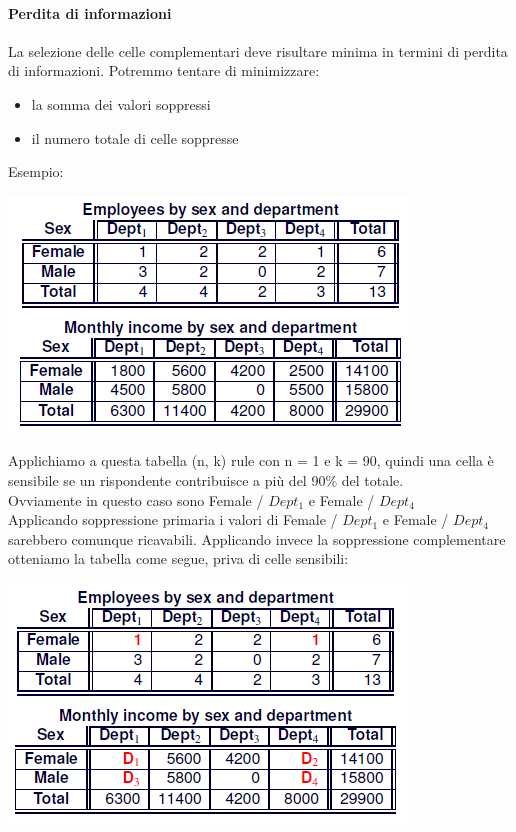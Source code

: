 \paragraph{Perdita di informazioni} La selezione delle celle complementari deve risultare minima in termini di perdita di informazioni. Potremmo tentare di minimizzare:
\begin{itemize}
    \item la somma dei valori soppressi
    \item il numero totale di celle soppresse
\end{itemize}

Esempio: 
\begin{center}
    \includegraphics[scale=0.6]{img/magtab1.png}
\end{center}
Applichiamo a questa tabella (n, k) rule con n = 1 e k = 90, quindi una cella è sensibile se un rispondente contribuisce a più del 90\% del totale.\\
Ovviamente in questo caso sono Female / \(Dept_1\) e Female / \(Dept_4\) \\
Applicando soppressione primaria i valori di Female / \(Dept_1\) e Female / \(Dept_4\) sarebbero comunque ricavabili. Applicando invece la soppressione complementare otteniamo la tabella come segue, priva di celle sensibili:
\begin{center}
    \includegraphics[scale=0.6]{img/magtab2.png}
\end{center}

